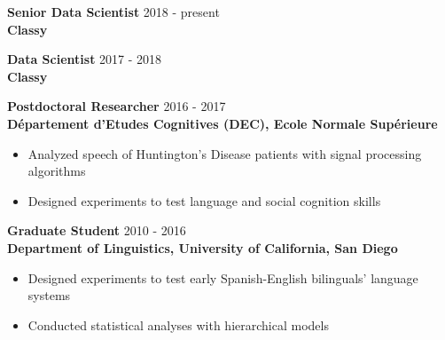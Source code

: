 \documentclass[9pt]{article}
\newenvironment{changemargin}[2]{%
  \begin{list}{}{%
    \setlength{\topsep}{0pt}%
    \setlength{\leftmargin}{#1}%
    \setlength{\rightmargin}{#2}%
    \setlength{\listparindent}{\parindent}%
    \setlength{\itemindent}{\parindent}%
    \setlength{\parsep}{\parskip}%
  }%
  \item[]}{\end{list}
}
\newenvironment{body} {
	\vspace*{-16pt}
	\begin{changemargin}{-0.25in}{-0.5in}
  }	
	{\end{changemargin}
}
\begin{document}
\begin{body}
	\vspace{14pt}
	
	\textbf{Senior Data Scientist} \hfill 2018 - present\\
	\textbf{Classy}\\
	\medskip
	\medskip
	
	\textbf{Data Scientist} \hfill 2017 - 2018\\
	\textbf{Classy}\\
	\medskip
	\medskip
	
	\textbf{Postdoctoral Researcher} \hfill 2016 - 2017\\
	\textbf{D\'epartement d'Etudes Cognitives (DEC), Ecole Normale Sup\'erieure}\\
	\begin{itemize}
		\item Analyzed speech of Huntington's Disease patients with signal processing algorithms
		\item Designed experiments to test language and social cognition skills
	\end{itemize}
	\medskip
	\medskip
	
	\textbf{Graduate Student} \hfill 2010 - 2016\\
	\textbf{Department of Linguistics, University of California, San Diego}\\
	\begin{itemize}
		\item Designed experiments to test early Spanish-English bilinguals' language systems
		\item Conducted statistical analyses with hierarchical models
	\end{itemize}
	\medskip
	\medskip
	
\end{body}

\smallskip

\end{document}
